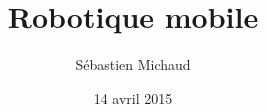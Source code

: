 \documentclass[14pt,t]{beamer}
\title[Robotique mobile]{Robotique mobile}
\subtitle{}
\author{Sébastien Michaud}
\institute{Université Laval}
\date{14 avril 2015}
\begin{document}
\begin{frame}
    \titlepage
\end{frame} 
    



\end{document}
